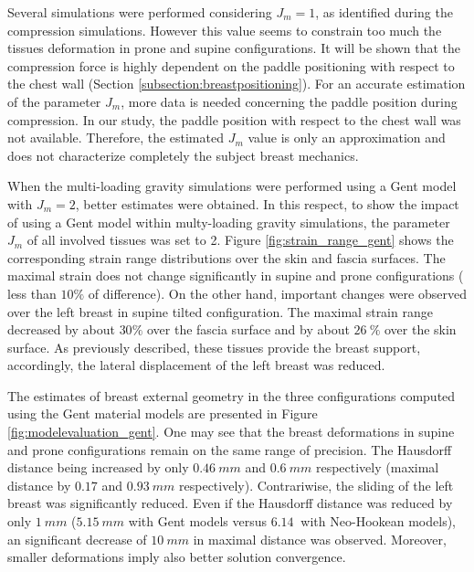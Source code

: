  Several simulations were performed considering $J_m = 1$, as identified during the compression simulations. However this value seems to constrain too much the tissues deformation in prone and supine configurations. It will be shown that the compression force is highly dependent on the paddle positioning with respect to the chest wall (Section \ref{subsection:breastpositioning}). For an accurate estimation of the parameter $J_m$, more data is needed concerning the paddle position during compression. In our study, the paddle position with respect to the chest wall was not available. Therefore, the estimated $J_m$ value is only an approximation and does not characterize completely the subject breast mechanics.    
 
When the multi-loading gravity simulations were performed using a Gent model with $J_m=2$, better estimates were obtained. In this respect, to show the impact of using a Gent model within multy-loading gravity simulations, the parameter $J_m$ of all involved tissues was set to 2. Figure \ref{fig:strain_range_gent} shows the corresponding strain range distributions over the skin and fascia surfaces.  The maximal strain does not change significantly in supine and prone configurations ( less than $10\%$ of difference). On the other hand, important changes were observed over the left breast in supine tilted configuration. The maximal strain range decreased by about $30\%$ over the fascia surface and by about $26 \ \%$ over the skin surface. As previously described, these tissues provide the breast support, accordingly,  the lateral displacement of the left breast was reduced.

 The estimates of breast external geometry in the three configurations computed using the Gent material models are presented in Figure \ref{fig:modelevaluation_gent}. One may see that the breast deformations in supine and prone configurations remain on the same range of precision. The Hausdorff distance being increased by only $0.46 \ mm$ and $0.6\ mm$ respectively (maximal distance by $0.17$ and $0.93 \ mm$ respectively). Contrariwise, the sliding of the left breast was significantly reduced. Even if the Hausdorff distance was reduced by only $1 \ mm $ ($5.15 \ mm$ with Gent models versus $6.14 \ $ with Neo-Hookean models), an significant decrease of $10 \ mm$ in maximal distance  was observed. Moreover, smaller deformations imply also better solution convergence. 
   

